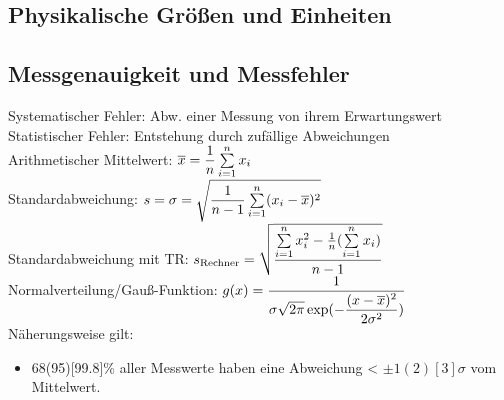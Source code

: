 \documentclass[fs, footer]{latex4ei}
\begin{document}
\vspace*{-10mm} %
\begin{multicols*}{4}



\iffalse
	\emphbox{
	\textbf{Wichtiger Hinweis}
	\\ Diese Formelsammlung ist noch in der Entwicklung und nicht prüfungstauglich ! \\ Allerdings würden wir uns über Unterstützung freuen das zu ändern. Wer Lust hat kann uns über das Kontaktformular auf www.latex4ei.de erreichen.
	}\fi
\section{Physikalische Größen und Einheiten}

\subsection{Messgenauigkeit und Messfehler}
Systematischer Fehler: Abw. einer Messung von ihrem Erwartungswert\\
Statistischer Fehler: Entstehung durch zufällige Abweichungen\\
Arithmetischer Mittelwert: $\ol x = \fr{1}{n}\sum_{i=1}^n x_i$\\
Standardabweichung: $s = \sigma = \sqrt{\fr{1}{n-1}\sum_{i=1}^n (x_i-\ol x)^2}$\\
Standardabweichung mit TR: $s_{\text{Rechner}} = \sqrt{ \fr{\sum_{i=1}^n x_i^2 - \frac{1}{n} (\sum_{i=1}^n x_i)}{n-1} }$\\
Normalverteilung/Gauß-Funktion: $g(x) = \dfrac{1}{\sigma \sqrt{2\pi}\exp(-\dfrac{(x-\overline{x})^2}{2\sigma^2})}$\\
Näherungsweise gilt: 
\begin{itemize}
\item 68(95)[99.8]\% aller Messwerte haben eine Abweichung < $\pm 1(2)[3]\sigma$ vom Mittelwert.
\end{itemize}



\end{multicols*}
\end{document}
